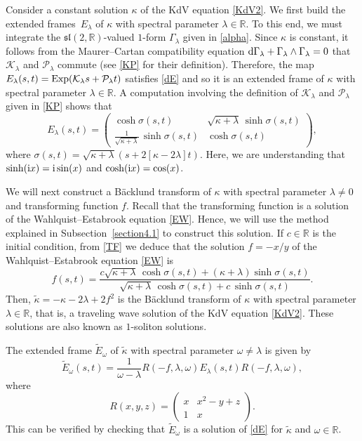 \documentclass[10pt,a4paper]{amsart}
\numberwithin{equation}{section}
\def\bending{\kappa}
\def\R{\mathbb{R}}
\begin{document}
Consider a constant solution $\bending$ of the KdV equation \eqref{KdV2}. We first build the extended frames~$E_\lambda$ of $\bending$ with spectral parameter $\lambda\in\R$. To this end, we must integrate the $\mathfrak{sl}(2,\mathbb{R})$-valued $1$-form $\Gamma_\lambda$ given in \eqref{alpha}.
Since $\bending$ is constant, it follows from the Maurer--Cartan compatibility equation ${\rm d}\Gamma_\lambda+\Gamma_\lambda\wedge\Gamma_\lambda=0$ that $\mathcal{K}_\lambda$ and $\mathcal{P}_\lambda$ commute (see \eqref{KP} for their definition). Therefore, the map $E_\lambda(s,t)={\rm Exp}(\mathcal{K}_\lambda s+\mathcal{P}_\lambda t)$ satisfies \eqref{dE} and so it is an extended frame of $\bending$ with spectral parameter $\lambda\in\mathbb{R}$. A computation involving the definition of $\mathcal{K}_\lambda$ and $\mathcal{P}_\lambda$ given in \eqref{KP} shows that
\begin{equation*}
	E_{\lambda}(s,t) = \begin{pmatrix}\cosh\sigma(s,t)&\sqrt{\bending+\lambda}\,\sinh\sigma(s,t)\\
		\frac{1}{\sqrt{\bending+\lambda}}\,\sinh\sigma(s,t)&\cosh\sigma(s,t)\end{pmatrix},
\end{equation*}
where $\sigma(s,t)=\sqrt{\bending+\lambda}(s+2[\bending-2\lambda]t)$.
Here, we are understanding that $\sinh({\rm i}x)={\rm i}\sin(x)$ and $\cosh({\rm i}x)=\cos(x)$.

We will next construct a B\"{a}cklund transform of $\bending$ with spectral parameter $\lambda\neq 0$ and transforming function $f$. Recall that the transforming function is a solution of the Wahlquist--Estabrook equation \eqref{EW}. Hence, we will use the method explained in Subsection~\ref{section4.1} to construct this solution. If $c\in\R$ is the initial condition, from \eqref{TF} we deduce that the solution $f=-x/y$ of the Wahlquist--Estabrook equation \eqref{EW} is
\begin{equation}\label{f}
	f(s,t)=\frac{c\sqrt{\bending+\lambda}\,\cosh\sigma(s,t)+(\bending+\lambda)\sinh\sigma(s,t)}{\sqrt{\bending+\lambda}\,\cosh\sigma(s,t)+c\,\sinh\sigma(s,t)}.
\end{equation}
Then, $\widetilde{\bending}=-\bending -2\lambda +2f^2$
is the B\"{a}cklund transform  of  $\bending$ with spectral parameter $\lambda\in\R$, that is, a traveling wave solution of the KdV equation \eqref{KdV2}. These solutions are also known as $1$-soliton solutions.

The extended frame $\widetilde{E}_{\omega}$ of $\widetilde{\bending}$ with spectral parameter $\omega\neq \lambda$ is given by
\begin{equation}\label{recon}
	\widetilde{E}_{\omega}(s,t)=\frac{1}{\omega-\lambda}R(-f,\lambda,\omega) E_{\lambda}(s,t) R(-f,\lambda,\omega),
\end{equation}
where
\begin{equation*}R(x,y,z)=\begin{pmatrix}x&x^2-y+z\\1&x\end{pmatrix}.\end{equation*}
This can be verified by checking that $\widetilde{E}_{\omega}$ is a solution of \eqref{dE} for $\widetilde{\bending}$ and $\omega\in\R$.
\end{document}
